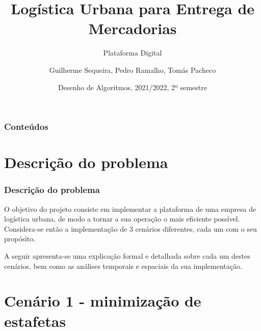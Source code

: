 \documentclass{beamer}
\title[Plataforma Digital]
{Logística Urbana para Entrega de Mercadorias}
\subtitle{Plataforma Digital}
\author[Grupo 30, 2LEIC03]
{Guilherme Sequeira, Pedro Ramalho, Tomás Pacheco}
\institute[FEUP]
{
  Faculdade de Engenheria\\
  Universidade do Porto
}
\date[2021/2022 2S]
{Desenho de Algoritmos, 2021/2022, 2º semestre}
\begin{document}

\frame{\titlepage}



\begin{frame}
  \frametitle{Conteúdos}
  \tableofcontents
\end{frame}






\section{Descrição do problema}


\begin{frame}[fragile]
\frametitle{Descrição do problema}
O objetivo do projeto consiste em implementar a plataforma de uma empresa
de logística urbana, de modo a tornar a sua operação o mais eficiente possível.
Considera-se então a implementação de 3 cenários diferentes, cada um com o seu propósito.

A seguir apresenta-se uma explicação formal e detalhada sobre cada um destes cenários, bem como
as análises temporais e espaciais da sua implementação.
\end{frame}








\section{Cenário 1 - minimização de estafetas}
\end{document}
